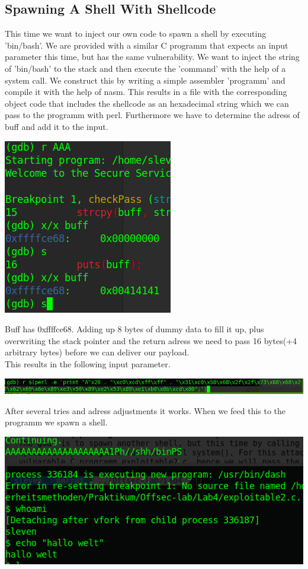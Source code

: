 \documentclass[a4paper,10pt]{article}
\begin{document}
\subsection{Spawning A Shell With Shellcode}
This time we want to inject our own code to spawn a shell by executing 'bin/bash'. We are provided with a similar C programm that expects an input parameter this time, but has the same vulnerability. We want to inject the string of 'bin/bash' to the stack and then execute the 'command' with the help of a system call.
We construct this by writing a simple assembler 'programm' and compile it with the help of nasm. This results in a file with the corresponding object code that includes the shellcode as an hexadecimal string which we can pass to the programm with perl. 
Furthermore we have to determine the adress of buff and add it to the input.
\begin{center}
 \includegraphics[scale=0.5]{breakpoint.png}
\end{center}
Buff has 0xffffce68. Adding up 8 bytes of dummy data to fill it up, plus overwriting the stack pointer and the return adress we need to pass 16 bytes(+4 arbitrary bytes) before we can deliver our payload.\\
This results in the following input parameter.
\begin{center}
 \includegraphics[scale=0.4]{pay2.png}
\end{center}
After several tries and adress adjustments it works.
When we feed this to the programm we spawn a shell.
\begin{center}
 \includegraphics[scale=0.5]{shells.png}
\end{center}
\end{document}

